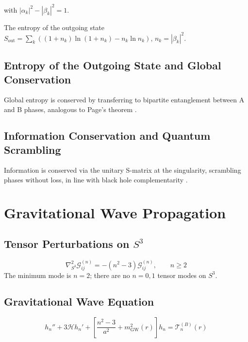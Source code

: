 \documentclass[10pt,twocolumn]{article}
\theoremstyle{definition}
\newcommand{\Hcal}{\mathcal{H}}
\begin{document}
with \( |\alpha_{k}|^{2} - |\beta_{k}|^{2} = 1 \).

The entropy of the outgoing state \( S_{\mathrm{out}} = \sum_{k} ( (1 + n_{k}) \ln(1 + n_{k}) - n_{k} \ln n_{k} ) \), \( n_{k} = |\beta_{k}|^{2} \).

\subsection{Entropy of the Outgoing State and Global Conservation}

Global entropy is conserved by transferring to bipartite entanglement between A and B phases, analogous to Page's theorem \citep{Page1993}.

\subsection{Information Conservation and Quantum Scrambling}

Information is conserved via the unitary S-matrix at the singularity, scrambling phases without loss, in line with black hole complementarity \citep{Susskind1993}.

\section{Gravitational Wave Propagation}
\label{sec:gw}

\subsection{Tensor Perturbations on \( S^{3} \)}

\begin{equation}
  \nabla^{2}_{S^{3}}\mathcal{G}^{(n)}_{ij}
    = -(n^{2}-3)\mathcal{G}^{(n)}_{ij},
  \qquad n\geq2
\end{equation}
The minimum mode is \( n=2 \); there are no \( n=0,1 \) tensor
modes on \( S^{3} \).

\subsection{Gravitational Wave Equation}

\begin{equation}
  h_{n}''+3\Hcal h_{n}'+\left[
    \frac{n^{2}-3}{a^{2}}+m_{\mathrm{GW}}^{2}(r)
  \right]h_{n} = \mathcal{T}_{n}^{(B)}(r)
  \label{eq:GW-eq}
\end{equation}
\end{document}
